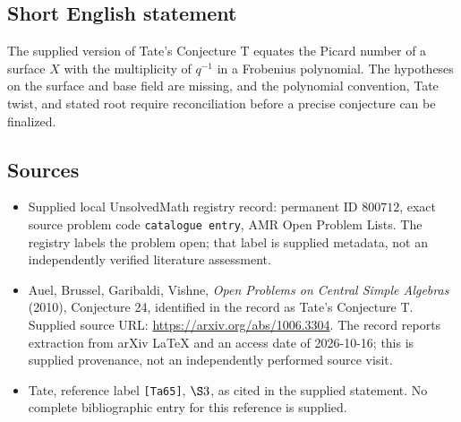 \documentclass[11pt]{article}
\begin{document}
\subsection{Short English statement}
The supplied version of Tate's Conjecture T equates the Picard number of a surface \(X\) with the multiplicity of \(q^{-1}\) in a Frobenius polynomial. The hypotheses on the surface and base field are missing, and the polynomial convention, Tate twist, and stated root require reconciliation before a precise conjecture can be finalized.
\subsection{Sources}
\begin{itemize}
\item Supplied local UnsolvedMath registry record: permanent ID \(800712\), exact source problem code \texttt{catalogue entry}, AMR Open Problem Lists. The registry labels the problem open; that label is supplied metadata, not an independently verified literature assessment.
\item Auel, Brussel, Garibaldi, Vishne, \emph{Open Problems on Central Simple Algebras} (2010), Conjecture 24, identified in the record as Tate's Conjecture T. Supplied source URL: \url{https://arxiv.org/abs/1006.3304}. The record reports extraction from arXiv LaTeX and an access date of 2026-10-16; this is supplied provenance, not an independently performed source visit.
\item Tate, reference label \texttt{[Ta65]}, \(\S 3\), as cited in the supplied statement. No complete bibliographic entry for this reference is supplied.
\end{itemize}
\end{document}
